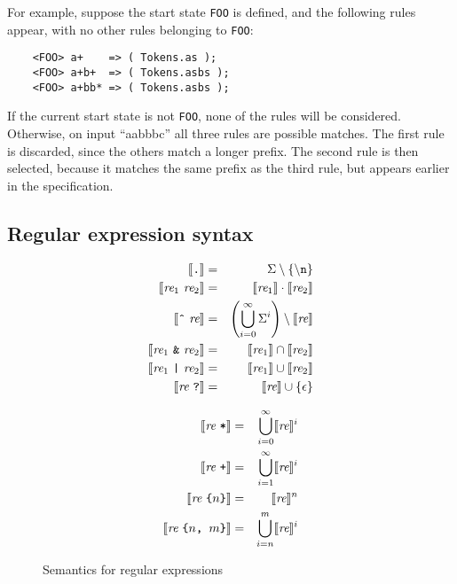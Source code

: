 For example, suppose the start state {\tt FOO} is defined, and the following rules appear, with no other rules belonging to {\tt FOO}:
\begin{verbatim}
    <FOO> a+    => ( Tokens.as );
    <FOO> a+b+  => ( Tokens.asbs );
    <FOO> a+bb* => ( Tokens.asbs );
\end{verbatim}
If the current start state is not {\tt FOO}, none of the rules will be considered.  Otherwise, on input ``aabbbc'' all three rules are possible matches.  The first rule is discarded, since the others match a longer prefix.  The second rule is then selected, because it matches the same prefix as the third rule, but appears earlier in the specification.

\subsection{Regular expression syntax}

\newcommand{\REX}{\textit{re}}
\begin{figure}
\begin{minipage}[t]{.5\textwidth}
\begin{eqnarray*}
  \sem{\T{.}} &=& \Sigma \setminus \{ \T{$\backslash$n} \} \\
  \sem{\REX_1 \ \REX_2} &=& \sem{\REX_1} \cdot \sem{\REX_2} \\
  \sem{\T{\^{ }} \ \REX} &=& \left(\bigcup_{i=0}^\infty \Sigma^i\right)\setminus \sem{\REX} \\
  \sem{\REX_1 \ \T{\&} \ \REX_2} &=& \sem{\REX_1} \cap \sem{\REX_2} \\
  \sem{\REX_1 \ \T{|} \ \REX_2} &=& \sem{\REX_1} \cup \sem{\REX_2} \\
  \sem{\REX \ \T{?}} &=& \sem{\REX} \cup \{ \epsilon \}
\end{eqnarray*}
\end{minipage}\begin{minipage}[t]{.5\textwidth}
\begin{eqnarray*}
  \sem{\REX \ \T{*}} &=& \bigcup_{i=0}^\infty \sem{\REX}^i \\
  \sem{\REX \ \T{+}} &=& \bigcup_{i=1}^\infty \sem{\REX}^i \\
  \sem{\REX \ \T{\{} n \T{\}}} &=& \sem{\REX}^n \\
  \sem{\REX \ \T{\{} n \T{, } m \T{\}}} &=& \bigcup_{i=n}^m \sem{\REX}^i
\end{eqnarray*}
\end{minipage}
\caption{Semantics for regular expressions}\label{ulex-re-semantics}
\end{figure}

